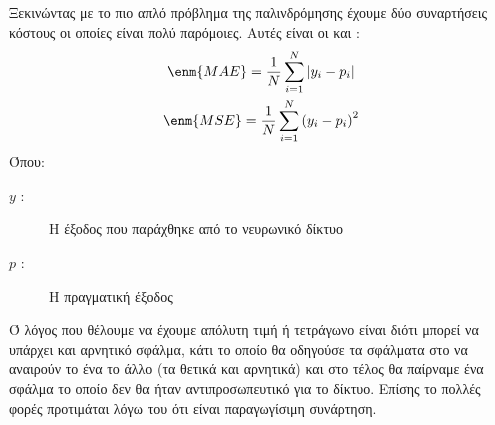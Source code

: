Ξεκινώντας με το πιο απλό πρόβλημα της παλινδρόμησης έχουμε δύο συναρτήσεις κόστους οι οποίες είναι πολύ παρόμοιες. Αυτές είναι οι  και :
\begin{gather*}
    \enm{MAE}=\frac{1}{N}\sum\limits_{i=1}^{N}\left\lvert y_i-p_i\right\rvert \\
    \enm{MSE}=\frac{1}{N}\sum\limits_{i=1}^{N}\left( y_i-p_i\right)^2
\end{gather*}
Όπου:
\begin{description}
    \item[$y$ :] Η έξοδος που παράχθηκε από το νευρωνικό δίκτυο
    \item[$p$ :] Η πραγματική έξοδος
\end{description}
Ό λόγος που θέλουμε να έχουμε απόλυτη τιμή ή τετράγωνο είναι διότι μπορεί να υπάρχει και αρνητικό σφάλμα, κάτι το οποίο θα οδηγούσε τα σφάλματα στο να αναιρούν το ένα το άλλο (τα θετικά και αρνητικά) και στο τέλος θα παίρναμε ένα σφάλμα το
οποίο δεν θα ήταν αντιπροσωπευτικό για το δίκτυο. Επίσης το  πολλές φορές προτιμάται λόγω του ότι είναι παραγωγίσιμη συνάρτηση.

